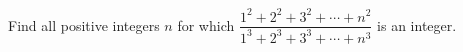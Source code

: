 Find all positive integers $n$ for which $\dfrac{1^2+2^2+3^2+\cdots+n^2}{1^3+2^3+3^3+\cdots+n^3}$ is an integer.
